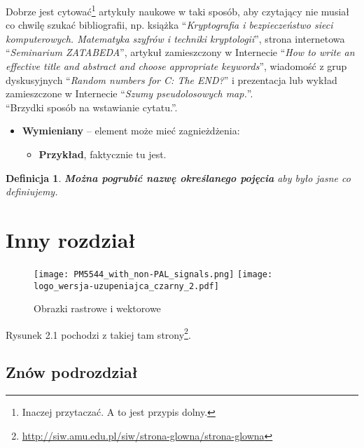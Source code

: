 \documentclass[12pt,a4paper,leqno,oneside,titlepage]{book}
\newtheorem{mydef}{Definicja}
\begin{document}
Dobrze jest cytować\footnote{Inaczej przytaczać. A to jest przypis dolny.} artykuły naukowe w taki sposób, aby czytający nie musiał co chwilę szukać bibliografii, np. książka ``\textit{Kryptografia i bezpieczeństwo sieci komputerowych. Matematyka szyfrów i techniki kryptologii}''\cite{Stallings11kryptografia}, strona internetowa ``\textit{Seminarium ZATABEDA}''\cite{Gogolewski13seminarium}, artykuł zamieszczony w Internecie ``\textit{How to write an effective title and abstract and choose appropriate keywords}''\cite{Rodrigues13howtowrite}, wiadomość z grup dyskusyjnych ``\textit{Random numbers for C: The END?}''\cite{Marsaglia99randomnum} i prezentacja lub wykład zamieszczone w Internecie ``\textit{Szumy pseudolosowych map.}''\cite{Hanc15szumy}.\\

``Brzydki sposób na wstawianie cytatu.''.

\begin{itemize}
\item \textbf{Wymieniany} -- element może mieć zagnieżdżenia:
    \begin{itemize}
    \item \textbf{Przykład}, faktycznie tu jest.
    \end{itemize}
\end{itemize}

\begin{mydef}
\textbf{Można pogrubić nazwę określanego pojęcia} aby było jasne co definiujemy.
\end{mydef}

\chapter{Inny rozdział}

\begin{figure}[h!]
  \centering
    \texttt{[image: PM5544\_with\_non-PAL\_signals.png]}
    \texttt{[image: logo\_wersja-uzupeniajca\_czarny\_2.pdf]}
  \caption{Obrazki rastrowe i wektorowe}
\end{figure}

Rysunek 2.1 pochodzi z takiej tam strony\footnote{\url{http://siw.amu.edu.pl/siw/strona-glowna/strona-glowna}}.

\section{Znów podrozdział}
\end{document}
